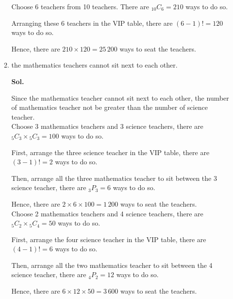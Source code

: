 \documentclass{report}
\newcommand\permtwo[2][^n]{{}_{#1}P_{#2}}
\newcommand\comb[2][^n]{{}_{#1}C_{#2}}
\newcommand{\sol}[1]{

      \noindent \textbf{Sol.}
}
\def\eos{\quad\hbox{\rlap{\hbox{\vrule depth 1.5pt height 2.6mm width 0.2mm \hskip 1mm \vrule height 2.6mm width 0.2mm}}{\vbox{\hrule height 0.2mm width 1.4mm \vskip 2.8mm \hrule depth 1.5pt height -0.35mm width 1.2mm}}}}
\begin{document}
\begin{multicols*}{2}
\begin{enumerate}
\begin{enumerate}
                              Choose 6 teachers from 10 teachers. There are $\comb[10]{6} = 210$ ways to do
                              so.

                              Arranging these 6 teachers in the VIP table, there are $(6 - 1)! = 120$ ways to
                              do so.

                              Hence, there are $210 \times 120 = 25\,200$ ways to seat the teachers. $\eos$

                        \item the mathematics teachers cannot sit next to each other. \sol{}

                              Since the mathematics teacher cannot sit next to each other, the number of
                              mathematics teacher not be greater than the number of science teacher.\\

                              Choose 3 mathematics teachers and 3 science teachers, there are $\comb[5]{3}
                                    \times \comb[5]{3} = 100$ ways to do so.

                              First, arrange the three science teacher in the VIP table, there are $(3 - 1)!
                                    = 2$ ways to do so.

                              Then, arrange all the three mathematics teacher to sit between the 3 science
                              teacher, there are $\permtwo[3]{3} = 6 $ ways to do so.

                              Hence, there are $2 \times 6 \times 100 = 1\,200$ ways to seat the teachers.\\

                              Choose 2 mathematics teachers and 4 science teachers, there are $\comb[5]{2}
                                    \times \comb[5]{4} = 50$ ways to do so.

                              First, arrange the four science teacher in the VIP table, there are $(4 - 1)! =
                                    6$ ways to do so.

                              Then, arrange all the two mathematics teacher to sit between the 4 science
                              teacher, there are $\permtwo[4]{2} = 12$ ways to do so.

                              Hence, there are $6 \times 12 \times 50 = 3\,600$ ways to seat the teachers.\\


\end{enumerate}
\end{enumerate}
\end{multicols*}
\end{document}
